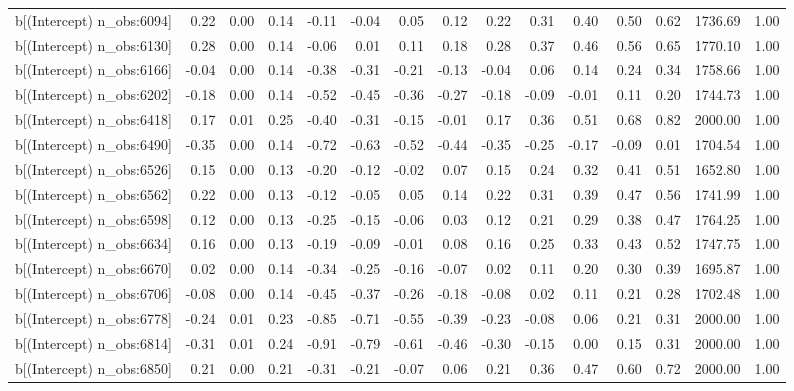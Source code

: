 \begin{table}[ht]
\begin{tabular}{rrrrrrrrrrrrrrr}
  b[(Intercept) n\_obs:6094] & 0.22 & 0.00 & 0.14 & -0.11 & -0.04 & 0.05 & 0.12 & 0.22 & 0.31 & 0.40 & 0.50 & 0.62 & 1736.69 & 1.00 \\ 
  b[(Intercept) n\_obs:6130] & 0.28 & 0.00 & 0.14 & -0.06 & 0.01 & 0.11 & 0.18 & 0.28 & 0.37 & 0.46 & 0.56 & 0.65 & 1770.10 & 1.00 \\ 
  b[(Intercept) n\_obs:6166] & -0.04 & 0.00 & 0.14 & -0.38 & -0.31 & -0.21 & -0.13 & -0.04 & 0.06 & 0.14 & 0.24 & 0.34 & 1758.66 & 1.00 \\ 
  b[(Intercept) n\_obs:6202] & -0.18 & 0.00 & 0.14 & -0.52 & -0.45 & -0.36 & -0.27 & -0.18 & -0.09 & -0.01 & 0.11 & 0.20 & 1744.73 & 1.00 \\ 
  b[(Intercept) n\_obs:6418] & 0.17 & 0.01 & 0.25 & -0.40 & -0.31 & -0.15 & -0.01 & 0.17 & 0.36 & 0.51 & 0.68 & 0.82 & 2000.00 & 1.00 \\ 
  b[(Intercept) n\_obs:6490] & -0.35 & 0.00 & 0.14 & -0.72 & -0.63 & -0.52 & -0.44 & -0.35 & -0.25 & -0.17 & -0.09 & 0.01 & 1704.54 & 1.00 \\ 
  b[(Intercept) n\_obs:6526] & 0.15 & 0.00 & 0.13 & -0.20 & -0.12 & -0.02 & 0.07 & 0.15 & 0.24 & 0.32 & 0.41 & 0.51 & 1652.80 & 1.00 \\ 
  b[(Intercept) n\_obs:6562] & 0.22 & 0.00 & 0.13 & -0.12 & -0.05 & 0.05 & 0.14 & 0.22 & 0.31 & 0.39 & 0.47 & 0.56 & 1741.99 & 1.00 \\ 
  b[(Intercept) n\_obs:6598] & 0.12 & 0.00 & 0.13 & -0.25 & -0.15 & -0.06 & 0.03 & 0.12 & 0.21 & 0.29 & 0.38 & 0.47 & 1764.25 & 1.00 \\ 
  b[(Intercept) n\_obs:6634] & 0.16 & 0.00 & 0.13 & -0.19 & -0.09 & -0.01 & 0.08 & 0.16 & 0.25 & 0.33 & 0.43 & 0.52 & 1747.75 & 1.00 \\ 
  b[(Intercept) n\_obs:6670] & 0.02 & 0.00 & 0.14 & -0.34 & -0.25 & -0.16 & -0.07 & 0.02 & 0.11 & 0.20 & 0.30 & 0.39 & 1695.87 & 1.00 \\ 
  b[(Intercept) n\_obs:6706] & -0.08 & 0.00 & 0.14 & -0.45 & -0.37 & -0.26 & -0.18 & -0.08 & 0.02 & 0.11 & 0.21 & 0.28 & 1702.48 & 1.00 \\ 
  b[(Intercept) n\_obs:6778] & -0.24 & 0.01 & 0.23 & -0.85 & -0.71 & -0.55 & -0.39 & -0.23 & -0.08 & 0.06 & 0.21 & 0.31 & 2000.00 & 1.00 \\ 
  b[(Intercept) n\_obs:6814] & -0.31 & 0.01 & 0.24 & -0.91 & -0.79 & -0.61 & -0.46 & -0.30 & -0.15 & 0.00 & 0.15 & 0.31 & 2000.00 & 1.00 \\ 
  b[(Intercept) n\_obs:6850] & 0.21 & 0.00 & 0.21 & -0.31 & -0.21 & -0.07 & 0.06 & 0.21 & 0.36 & 0.47 & 0.60 & 0.72 & 2000.00 & 1.00 \\ 

\end{tabular}
\end{table}
